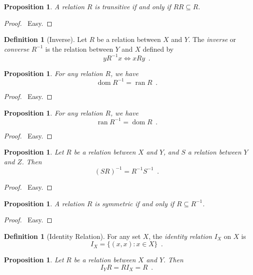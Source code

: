 \documentclass{report}
\let\qed\relax
\newtheorem{prop}[ax]{Proposition}
\theoremstyle{definition}
\newtheorem{df}[ax]{Definition}
\newcommand{\dom}{\ensuremath{\operatorname{dom}}}
\newcommand{\ran}{\ensuremath{\operatorname{ran}}}
\begin{document}
\begin{prop}
A relation $R$ is transitive if and only if $RR \subseteq R$.
\end{prop}

\begin{proof}
\pf\ Easy. \qed
\end{proof}

\begin{df}[Inverse]
Let $R$ be a relation between $X$ and $Y$. The \emph{inverse} or \emph{converse} $R^{-1}$ is the relation between $Y$ and $X$ defined by
\[ y R^{-1} x \Leftrightarrow x R y \enspace . \]
\end{df}

\begin{prop}
For any relation $R$, we have
\[ \dom R^{-1} = \ran R \enspace . \]
\end{prop}

\begin{proof}
\pf\ Easy. \qed
\end{proof}

\begin{prop}
For any relation $R$, we have
\[ \ran R^{-1} = \dom R \enspace . \]
\end{prop}

\begin{proof}
\pf\ Easy. \qed
\end{proof}

\begin{prop}
Let $R$ be a relation between $X$ and $Y$, and $S$ a relation between $Y$ and $Z$. Then
\[ (SR)^{-1} = R^{-1}S^{-1} \enspace . \]
\end{prop}

\begin{proof}
\pf\ Easy. \qed
\end{proof}

\begin{prop}
A relation $R$ is symmetric if and only if $R \subseteq R^{-1}$.
\end{prop}

\begin{proof}
\pf\ Easy. \qed
\end{proof}

\begin{df}[Identity Relation]
For any set $X$, the \emph{identity relation} $I_X$ on $X$ is
\[ I_X = \{(x,x) : x \in X \} \enspace . \]
\end{df}

\begin{prop}
Let $R$ be a relation between $X$ and $Y$. Then
\[ I_Y R = R I_X = R \enspace . \]
\end{prop}
\end{document}

